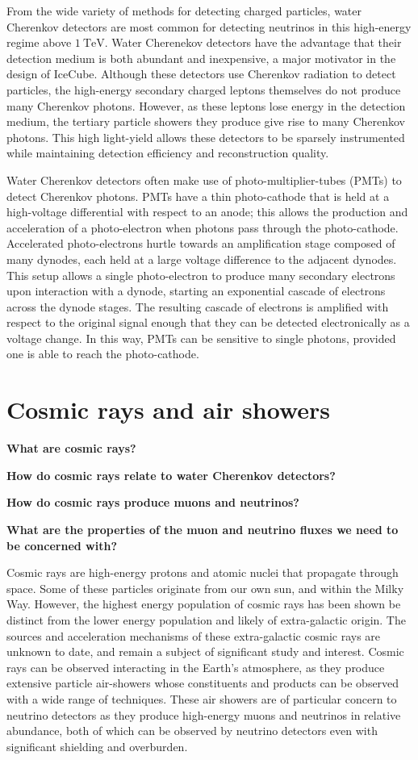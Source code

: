 From the wide variety of methods for detecting charged particles, water Cherenkov detectors are most common for detecting neutrinos in this high-energy regime above $\SI{1}\TeV$.
Water Cherenekov detectors have the advantage that their detection medium is both abundant and inexpensive, a major motivator in the design of IceCube.
Although these detectors use Cherenkov radiation to detect particles, the high-energy secondary charged leptons themselves do not produce many Cherenkov photons.
However, as these leptons lose energy in the detection medium, the tertiary particle showers they produce give rise to many Cherenkov photons.
This high light-yield allows these detectors to be sparsely instrumented while maintaining detection efficiency and reconstruction quality.

Water Cherenkov detectors often make use of photo-multiplier-tubes (PMTs) to detect Cherenkov photons.
PMTs have a thin photo-cathode that is held at a high-voltage differential with respect to an anode; this allows the production and acceleration of a photo-electron when photons pass through the photo-cathode.
Accelerated photo-electrons hurtle towards an amplification stage composed of many dynodes, each held at a large voltage difference to the adjacent dynodes.
This setup allows a single photo-electron to produce many secondary electrons upon interaction with a dynode, starting an exponential cascade of electrons across the dynode stages.
The resulting cascade of electrons is amplified with respect to the original signal enough that they can be detected electronically as a voltage change.
In this way, PMTs can be sensitive to single photons, provided one is able to reach the photo-cathode.

\section{Cosmic rays and air showers}

\textbf{What are cosmic rays?}

\textbf{How do cosmic rays relate to water Cherenkov detectors?}

\textbf{How do cosmic rays produce muons and neutrinos?}

\textbf{What are the properties of the muon and neutrino fluxes we need to be concerned with?}

Cosmic rays are high-energy protons and atomic nuclei that propagate through space.
Some of these particles originate from our own sun, and within the Milky Way.
However, the highest energy population of cosmic rays has been shown be distinct from the lower energy population and likely of extra-galactic origin.
The sources and acceleration mechanisms of these extra-galactic cosmic rays are unknown to date, and remain a subject of significant study and interest.
Cosmic rays can be observed interacting in the Earth's atmosphere, as they produce extensive particle air-showers whose constituents and products can be observed with a wide range of techniques.
These air showers are of particular concern to neutrino detectors as they produce high-energy muons and neutrinos in relative abundance, both of which can be observed by neutrino detectors even with significant shielding and overburden.

